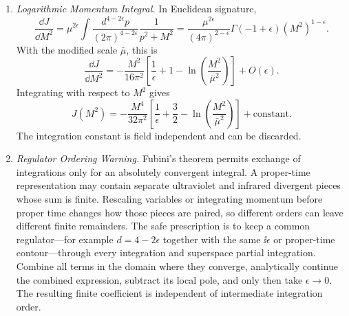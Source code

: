\begin{enumerate}
  \begin{enumerate}
    \item \emph{Logarithmic Momentum Integral.}
    In Euclidean signature,
      \[
        \frac{\dd J}{\dd M^2}
          =\mu^{2\epsilon}
           \int\frac{d^{4-2\epsilon}p}{(2\pi)^{4-2\epsilon}}
           \frac1{p^2+M^2}
          =\frac{\mu^{2\epsilon}}{(4\pi)^{2-\epsilon}}
           \Gamma(-1+\epsilon)(M^2)^{1-\epsilon}.
      \]
      With the modified scale \(\bar\mu\), this is
      \[
        \frac{\dd J}{\dd M^2}
          =-\frac{M^2}{16\pi^2}
           \left[
             \frac1\epsilon+1-\ln\!\left(\frac{M^2}{\bar\mu^2}\right)
           \right]+O(\epsilon).
      \]
      Integrating with respect to \(M^2\) gives
      \[
        J(M^2)
          =-\frac{M^4}{32\pi^2}
           \left[
             \frac1\epsilon+\frac32
             -\ln\!\left(\frac{M^2}{\bar\mu^2}\right)
           \right]+\text{constant}.
      \]
      The integration constant is field independent and can be discarded.
    \item \emph{Regulator Ordering Warning.}
    Fubini's theorem permits exchange of integrations only for an
      absolutely convergent integral.  A proper-time representation may
      contain separate ultraviolet and infrared divergent pieces whose
      sum is finite.  Rescaling variables or integrating momentum before
      proper time changes how those pieces are paired, so different orders
      can leave different finite remainders.  The safe prescription is to
      keep a common regulator---for example \(d=4-2\epsilon\) together with
      the same \(\ii\epsilon\) or proper-time contour---through every
      integration and superspace partial integration.  Combine all terms
      in the domain where they converge, analytically continue the combined
      expression, subtract its local pole, and only then take
      \(\epsilon\to0\).  The resulting finite coefficient is independent
      of intermediate integration order.
  \end{enumerate}


\end{enumerate}
